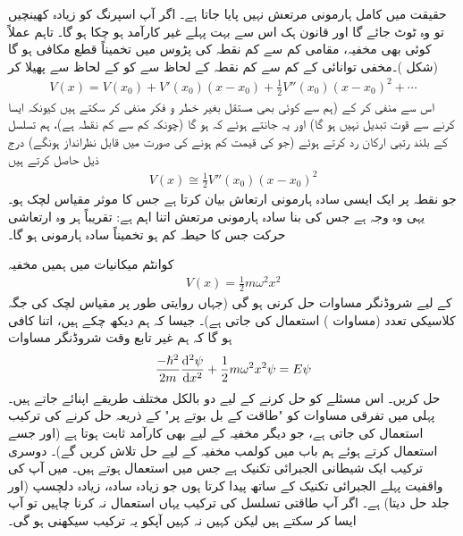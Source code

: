 حقیقت میں کامل ہارمونی مرتعش نہیں پایا جاتا ہے۔ اگر آپ اسپرنگ کو زیادہ  کھینچیں تو وہ  ٹوٹ جائے گا اور قانون ہک اس سے بہت پہلے غیر کارآمد ہو چکا ہو گا۔ تاہم عملاً کوئی بھی مخفیہ، مقامی کم سے کم نقطہ کی پڑوس میں تخمیناً قطع مکافی  ہو گا (شکل )۔مخفی توانائی  کے کم سے کم نقطہ  کے لحاظ سے  کو  کے لحاظ سے پھیلا کر
\begin{align*}
V(x)=V( x_{0})+V'(x_{0})(x-x_{0})+\frac{1}{2}V''(x_{0})(x-x_{0})^{2}+\cdots
\end{align*}
اس سے  منفی کر کے (ہم  سے کوئی بھی مستقل بغیر خطر و فکر منفی کر سکتے ہیں کیونکہ ایسا کرنے  سے قوت تبدیل نہیں ہو گا)  اور یہ جانتے ہوئے کہ  ہو گا (چونکہ  کم سے کم نقطہ ہے)، ہم تسلسل کے بلند رتبی ارکان  رد کرتے ہوئے (جو  کی قیمت کم ہونے کی صورت میں قابل نظرانداز ہونگے) درج ذیل حاصل کرتے ہیں
\begin{align*}
V(x)\cong\frac{1}{2}V''(x_{0})(x-x_{0})^{2}
\end{align*}
جو نقطہ  پر ایک ایسی سادہ  ہارمونی ارتعاش  بیان کرتا ہے  جس کا موثر مقیاس لچک  ہو۔ یہی وہ وجہ ہے جس کی بنا سادہ ہارمونی مرتعش اتنا اہم ہے: تقریباً ہر وہ ارتعاشی حرکت جس کا حیطہ کم ہو تخمیناً سادہ ہارمونی ہو گا۔

کوانٹم میکانیات میں ہمیں مخفیہ
\begin{align}
V(x)=\frac{1}{2}m\omega ^{2}x^{2}
\end{align}
کے لیے شروڈنگر  مساوات حل کرنی ہو گی (جہاں روایتی طور پر مقیاس لچک کی جگہ کلاسیکی تعدد (مساوات ) استعمال کی جاتی ہے)۔  جیسا کہ ہم دیکھ چکے ہیں، اتنا کافی ہو گا کہ  ہم  غیر تابع وقت شروڈنگر مساوات
\begin{align}\label{مساوات_شروڈنگر_مخفی_قوہ_الف}
\frac{-\hslash ^{2}}{2m}\frac{\dif{^{2}\psi}}{\dif{x^{2}}}+\frac{1}{2}m\omega ^{2}x^{2}\psi=E\psi
\end{align}
حل کریں۔ اس مسئلے کو حل کرنے کے لیے دو بالکل مختلف طریقے اپنائے جاتے ہیں۔ پہلی میں  تفرقی مساوات کو "طاقت کے بل بوتے پر"    کے ذریعہ حل کرنے کی ترکیب استعمال کی جاتی ہے، جو دیگر مخفیہ کے لیے بھی کارآمد ثابت ہوتا ہے  (اور جسے استعمال کرتے ہوئے ہم باب  میں کولمب مخفیہ کے لیے حل تلاش کریں گے)۔ دوسری ترکیب ایک شیطانی الجبرائی تکنیک ہے جس میں  استعمال ہوتے ہیں۔ میں آپ کی واقفیت پہلے الجبرائی تکنیک کے ساتھ پیدا کرتا ہوں جو زیادہ سادہ، زیادہ دلچسپ (اور جلد حل دیتا) ہے۔ اگر آپ طاقتی تسلسل کی ترکیب یہاں استعمال نہ کرنا چاہیں تو آپ ایسا کر سکتے ہیں لیکن کہیں نہ کہیں  آپکو یہ ترکیب سیکھنی ہو گی۔

